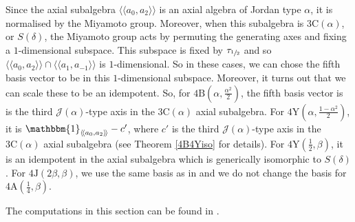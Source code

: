 \documentclass[11pt, a4paper]{article}
\theoremstyle{plain}
\theoremstyle{definition}
\newcommand\al{\alpha}
\newcommand\bt{\beta}
\newcommand\dl{\delta}
\newcommand\cJ{\mathcal{J}}
\newcommand\lla{\langle\!\langle}
\newcommand\rra{\rangle\!\rangle}
\newcommand{\A}{\mathrm{A}}
\newcommand{\B}{\mathrm{B}}
\newcommand{\C}{\mathrm{C}}
\newcommand{\J}{\mathrm{J}}
\newcommand{\Y}{\mathrm{Y}}
\newcommand{\0}{\overline{0}}
\newcommand{\2}{\overline{2}}
\newcommand{\half}{{\tau_{\sfrac{1}{2}}}} %
\newcommand{\1}{\mathbbm{1}}
\begin{document}
Since the axial subalgebra $\lla a_0, a_2 \rra$ is an axial algebra of Jordan type $\al$, it is normalised by the Miyamoto group.  Moreover, when this subalgebra is $3\C(\al)$, or $S(\dl)$, the Miyamoto group acts by permuting the generating axes and fixing a $1$-dimensional subspace.  This subspace is fixed by $\half$ and so $\lla a_0, a_2 \rra \cap \lla a_1, a_{-1} \rra$ is $1$-dimensional.  So in these cases, we can chose the fifth basis vector to be in this $1$-dimensional subspace.  Moreover, it turns out that we can scale these to be an idempotent.  So, for $4\B(\al, \frac{\al^2}{2})$, the fifth basis vector is is the third $\cJ(\al)$-type axis in the $3\C(\al)$ axial subalgebra.  For $4\Y(\al, \frac{1-\al^2}{2})$, it is $\1_{\lla a_0, a_2 \rra} - c'$, where $c'$ is the third $\cJ(\al)$-type axis in the $3\C(\al)$ axial subalgebra (see Theorem \ref{4B4Yiso} for details).  For $4\Y(\frac{1}{2}, \bt)$, it is an idempotent in the axial subalgebra which is generically isomorphic to $S(\dl)$.  For $4\J(2\bt, \bt)$, we use the same basis as in \cite{doubleMatsuo} and we do not change the basis for $4\A(\frac{1}{4}, \bt)$.

The computations in this section can be found in \cite[\texttt{X4 algebras.m}]{githubcode}.
\end{document}
